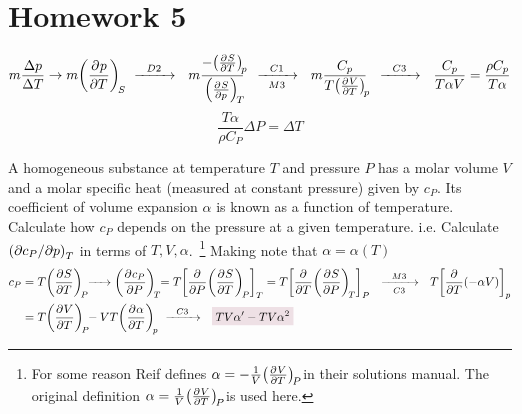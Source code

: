 \documentclass{article}
\begin{document}
\section{Homework 5}
    \begin{problem}[Reif 5.12]
        \answerline
        \begin{equation*}
            m\frac{\Delta p}{\Delta T}
            \rightarrow
            m\pder{p}{T}[S] 
            \CrushStep{D2} 
            m\DerivCrush*{p}{T}{S}
            \CrushStep{C1}[M3]
            m\frac{C_p}{T\pder{V}{T}[p]}
            \CrushStep{C3}
            \frac{C_p}{T\alpha V}=\frac{\rho C_p}{T\alpha}
        \end{equation*}
        \vspace{0.5cm}
        \begin{equation*}
            \frac{T\alpha}{\rho C_P}\Delta P=\Delta T
        \end{equation*}
    \end{problem}\newpage
    \begin{problem}[Reif 5.13]
        A homogeneous substance at temperature $T$ and pressure $P$ has a molar volume $V$ and a molar specific heat (measured at constant pressure) given by $c_P$. Its coefficient of volume expansion $\alpha$ is known as a function of temperature. Calculate how $c_P$ depends on the pressure at a given temperature. i.e. Calculate $\qty(\partial c_P/\partial p)_T$ in terms of $T,V,\alpha$.~\footnote{For some reason Reif defines $\alpha=-\oo{V}\pder{V}{T}[P]$ in their solutions manual. The original definition $\alpha=\oo{V}\pder{V}{T}[P]$ is used here.}
        \answerline
        Making note that $\alpha=\alpha(T)$
        \begin{align*}
            c_P&=T\pder{S}{T}[P]\xrightarrow{~~~~} \pder{c_P}{P}[T]=T\qty[\pder{P}\pder{S}{T}[P]~]_T=T\qty[\pder{T}\pder{S}{P}[T]~]_P\CrushStep{M3}[C3]T\qty[\pder{T}\qty(-\alpha V)]_p
            \\
            &=T\pder{V}{T}[P]-VT\pder{\alpha}{T}[p]\CrushStep{C3}\coloredanswer{TV\alpha'-TV\alpha^2}
        \end{align*}
    \end{problem}\newpage
\end{document}
